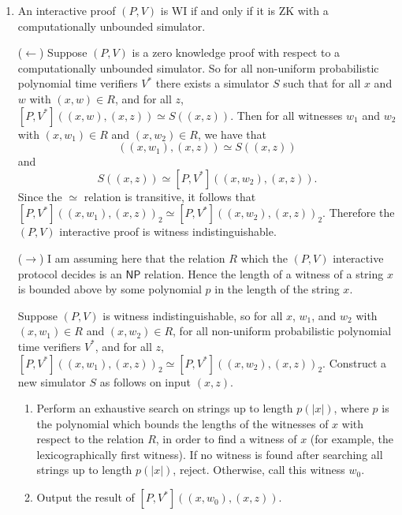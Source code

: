 \documentclass[draft]{article}
\begin{document}
\begin{enumerate}
\item
  An interactive proof $(P, V)$ is WI if and only if it is ZK with a computationally unbounded simulator.

  ($\leftarrow$) Suppose $(P, V)$ is a zero knowledge proof with respect to a computationally unbounded simulator.
  So for all non-uniform probabilistic polynomial time verifiers $V^*$ there exists a simulator $S$ such that for all $x$ and $w$ with $(x,w)\in R$, and for all $z$, $[P, V^*]\left((x, w), (x, z)\right)\simeq S\left((x, z)\right)$.
  Then for all witnesses $w_1$ and $w_2$ with $(x,w_1)\in R$ and $(x,w_2)\in R$, we have that
  \begin{displaymath}
    [P, V*]\left((x, w_1), (x, z)\right)\simeq S\left((x, z)\right)
  \end{displaymath}
  and
  \begin{displaymath}
    S\left((x, z)\right)\simeq[P, V^*]\left((x, w_2), (x, z)\right).
  \end{displaymath}
  Since the $\simeq$ relation is transitive, it follows that $[P, V^*]\left((x, w_1), (x, z)\right)_2\simeq[P, V^*]\left((x, w_2), (x, z)\right)_2$.
  Therefore the $(P, V)$ interactive proof is witness indistinguishable.

  ($\rightarrow$) I am assuming here that the relation $R$ which the $(P, V)$ interactive protocol decides is an $\mathsf{NP}$ relation.
  Hence the length of a witness of a string $x$ is bounded above by some polynomial $p$ in the length of the string $x$.

 Suppose $(P, V)$ is witness indistinguishable, so for all $x$, $w_1$, and $w_2$ with $(x, w_1)\in R$ and $(x, w_2)\in R$, for all non-uniform probabilistic polynomial time verifiers $V^*$, and for all $z$, $[P, V^*]\left((x, w_1), (x, z)\right)_2\simeq [P, V^*]\left((x, w_2), (x, z)\right)_2$.
  Construct a new simulator $S$ as follows on input $(x, z)$.
  \begin{enumerate}
  \item
    Perform an exhaustive search on strings up to length $p(|x|)$, where $p$ is the polynomial which bounds the lengths of the witnesses of $x$ with respect to the relation $R$, in order to find a witness of $x$ (for example, the lexicographically first witness).
    If no witness is found after searching all strings up to length $p(|x|)$, reject.
    Otherwise, call this witness $w_0$.
  \item Output the result of $[P, V^*]\left((x, w_0), (x, z)\right)$.
  \end{enumerate}


\end{enumerate}
\end{document}

